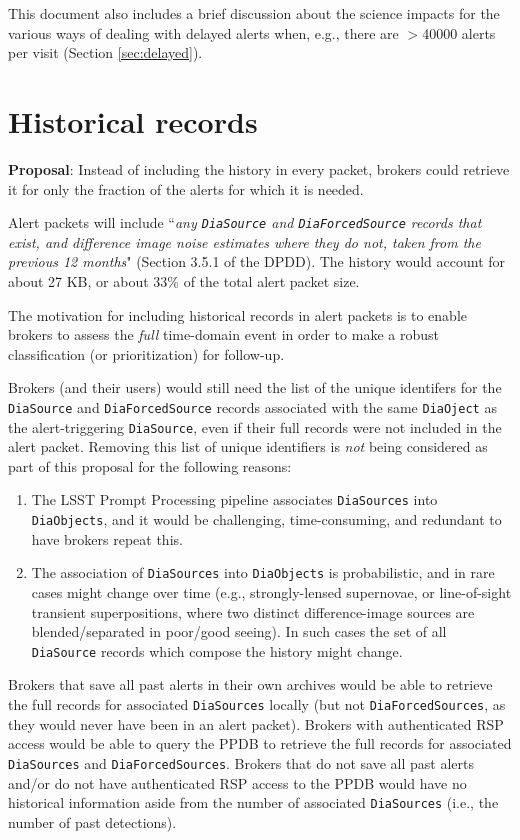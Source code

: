 \documentclass[DM,authoryear,toc]{lsstdoc}
\begin{document}
This document also includes a brief discussion about the science impacts for the various ways of dealing with 
delayed alerts when, e.g., there are $>$40000 alerts per visit (Section \ref{sec:delayed}).


\section{Historical records}\label{sec:histories}

\textbf{Proposal}: Instead of including the history in every packet, brokers could retrieve it for only the fraction 
of the alerts for which it is needed.

Alert packets will include ``\textit{any \texttt{DiaSource} and \texttt{DiaForcedSource} records that exist, and difference image noise
estimates where they do not, taken from the previous 12 months}" (Section 3.5.1 of the DPDD).
The history would account for about 27 KB, or about 33\% of the total alert packet size.

The motivation for including historical records in alert packets is to enable brokers to assess the \emph{full} 
time-domain event in order to make a robust classification (or prioritization) for follow-up.

Brokers (and their users) would still need the list of the unique identifers for the \texttt{DiaSource} and \texttt{DiaForcedSource} 
records associated with the same \texttt{DiaOject} as the alert-triggering \texttt{DiaSource}, even if their full records were not included 
in the alert packet.
Removing this list of unique identifiers is \emph{not} being considered as part of this proposal for the following reasons:

\begin{enumerate}
\item The LSST Prompt Processing pipeline associates \texttt{DiaSources} into \texttt{DiaObjects}, and it would be challenging, time-consuming, 
and redundant to have brokers repeat this.
\item The association of \texttt{DiaSources} into \texttt{DiaObjects} is probabilistic, and in rare cases might change over time 
(e.g., strongly-lensed supernovae, or line-of-sight transient superpositions, where two distinct difference-image sources are 
blended/separated in poor/good seeing).
In such cases the set of all \texttt{DiaSource} records which compose the history might change.
\end{enumerate}

Brokers that save all past alerts in their own archives would be able to retrieve the full records for associated \texttt{DiaSources} 
locally (but not \texttt{DiaForcedSources}, as they would never have been in an alert packet).
Brokers with authenticated RSP access would be able to query the PPDB to retrieve the full records for associated \texttt{DiaSources} 
and \texttt{DiaForcedSources}.
Brokers that do not save all past alerts and/or do not have authenticated RSP access to the PPDB would have no historical 
information aside from the number of associated \texttt{DiaSources} (i.e., the number of past detections).
\end{document}
